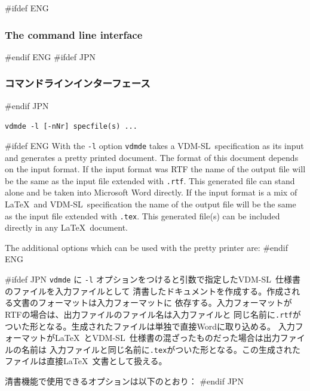 \documentclass[\pformat,12pt]{article}
\newcommand{\vdmslpp}{VDM-SL}
\newcommand{\vdmde}{vdmde}
\newcommand{\vdmslpp}{VDM++}
\newcommand{\vdmde}{vppde}
\begin{document}
#ifdef ENG
\subsubsection{The command line interface} \label{vdm2tex}
#endif ENG
#ifdef JPN
\subsubsection{コマンドラインインターフェース} \label{vdm2tex}
#endif JPN

{\tt \vdmde\ -l [-nNr] specfile(s) ...}

\vspace{0.5cm}

\noindent
#ifdef ENG
With the {\tt -l} option {\tt \vdmde} takes a \vdmslpp\
specification as its input and generates a pretty printed
document. The format of this document depends on the
input format. If the input format was RTF the name of the output file
will be the same as the input file extended with {\tt .rtf}. This
generated file can stand alone and be taken into Microsoft Word
directly. If the input format is a mix of \LaTeX\ and \vdmslpp\ 
specification the name of the output file will be the same as the
input file extended with {\tt .tex}. This generated file(s) can be
included directly in any \LaTeX\ document.

The additional options which can be used with the pretty printer are:
#endif ENG

#ifdef JPN
{\tt \vdmde} に {\tt -l} オプションをつけると引数で指定した\vdmslpp\ 仕様書のファイルを入力ファイルとして
清書したドキュメントを作成する。作成される文書のフォーマットは入力フォーマットに
依存する。入力フォーマットがRTFの場合は、出力ファイルのファイル名は入力ファイルと
同じ名前に{\tt .rtf}がついた形となる。生成されたファイルは単独で直接Wordに取り込める。
入力フォーマットが\LaTeX\ と\vdmslpp\ 仕様書の混ざったものだった場合は出力ファイルの名前は
入力ファイルと同じ名前に{\tt .tex}がついた形となる。この生成されたファイルは直接\LaTeX\ 
文書として扱える。

清書機能で使用できるオプションは以下のとおり：
#endif JPN
\end{document}
